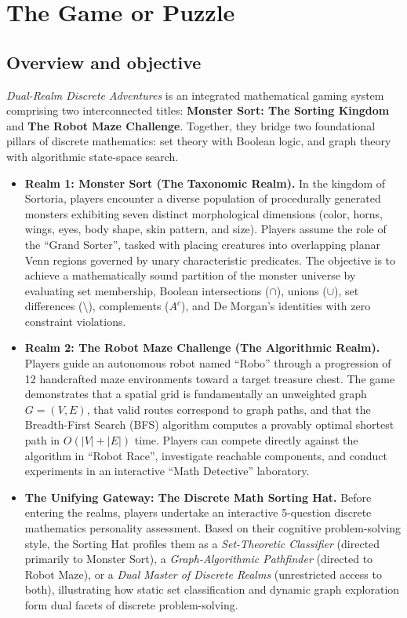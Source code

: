 \documentclass[11pt,a4paper]{article}
\begin{document}
\newpage
\section{The Game or Puzzle}

\subsection{Overview and objective}
\textit{Dual-Realm Discrete Adventures} is an integrated mathematical gaming system comprising two interconnected titles: \textbf{Monster Sort: The Sorting Kingdom} and \textbf{The Robot Maze Challenge}. Together, they bridge two foundational pillars of discrete mathematics: set theory with Boolean logic, and graph theory with algorithmic state-space search.

\begin{itemize}
  \item \textbf{Realm 1: Monster Sort (The Taxonomic Realm).} In the kingdom of Sortoria, players encounter a diverse population of procedurally generated monsters exhibiting seven distinct morphological dimensions (color, horns, wings, eyes, body shape, skin pattern, and size). Players assume the role of the ``Grand Sorter'', tasked with placing creatures into overlapping planar Venn regions governed by unary characteristic predicates. The objective is to achieve a mathematically sound partition of the monster universe by evaluating set membership, Boolean intersections ($\cap$), unions ($\cup$), set differences ($\setminus$), complements ($A^c$), and De Morgan's identities with zero constraint violations.
  \item \textbf{Realm 2: The Robot Maze Challenge (The Algorithmic Realm).} Players guide an autonomous robot named ``Robo'' through a progression of 12 handcrafted maze environments toward a target treasure chest. The game demonstrates that a spatial grid is fundamentally an unweighted graph $G = (V, E)$, that valid routes correspond to graph paths, and that the Breadth-First Search (BFS) algorithm computes a provably optimal shortest path in $O(|V| + |E|)$ time. Players can compete directly against the algorithm in ``Robot Race'', investigate reachable components, and conduct experiments in an interactive ``Math Detective'' laboratory.
  \item \textbf{The Unifying Gateway: The Discrete Math Sorting Hat.} Before entering the realms, players undertake an interactive 5-question discrete mathematics personality assessment. Based on their cognitive problem-solving style, the Sorting Hat profiles them as a \textit{Set-Theoretic Classifier} (directed primarily to Monster Sort), a \textit{Graph-Algorithmic Pathfinder} (directed to Robot Maze), or a \textit{Dual Master of Discrete Realms} (unrestricted access to both), illustrating how static set classification and dynamic graph exploration form dual facets of discrete problem-solving.
\end{itemize}
\end{document}
